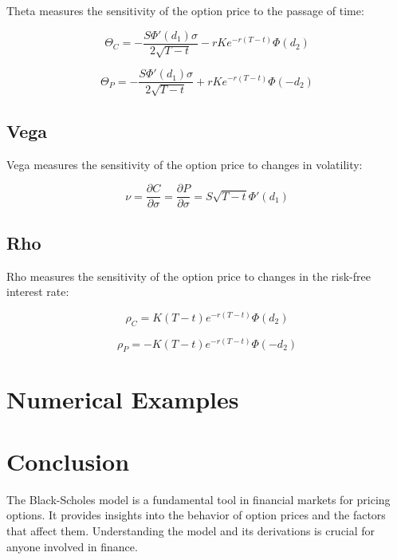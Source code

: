 \documentclass[../Main.tex]{subfiles}
\begin{document}
	Theta measures the sensitivity of the option price to the passage of time:
	
	\begin{equation}
		\Theta_C = -\frac{S \Phi'(d_1) \sigma}{2 \sqrt{T - t}} - r K e^{-r(T - t)} \Phi(d_2)
	\end{equation}
	
	\begin{equation}
		\Theta_P = -\frac{S \Phi'(d_1) \sigma}{2 \sqrt{T - t}} + r K e^{-r(T - t)} \Phi(-d_2)
	\end{equation}
	
	\subsection{Vega}
	
	Vega measures the sensitivity of the option price to changes in volatility:
	
	\begin{equation}
		\nu = \frac{\partial C}{\partial \sigma} = \frac{\partial P}{\partial \sigma} = S \sqrt{T - t} \Phi'(d_1)
	\end{equation}
	
	\subsection{Rho}
	
	Rho measures the sensitivity of the option price to changes in the risk-free interest rate:
	
	\begin{equation}
		\rho_C = K (T - t) e^{-r(T - t)} \Phi(d_2)
	\end{equation}
	
	\begin{equation}
		\rho_P = -K (T - t) e^{-r(T - t)} \Phi(-d_2)
	\end{equation}
	
	
	\section{Numerical Examples}
	
	
	
	\section{Conclusion}
	
	The Black-Scholes model is a fundamental tool in financial markets for pricing options. It provides insights into the behavior of option prices and the factors that affect them. Understanding the model and its derivations is crucial for anyone involved in finance.
	
\end{document}
